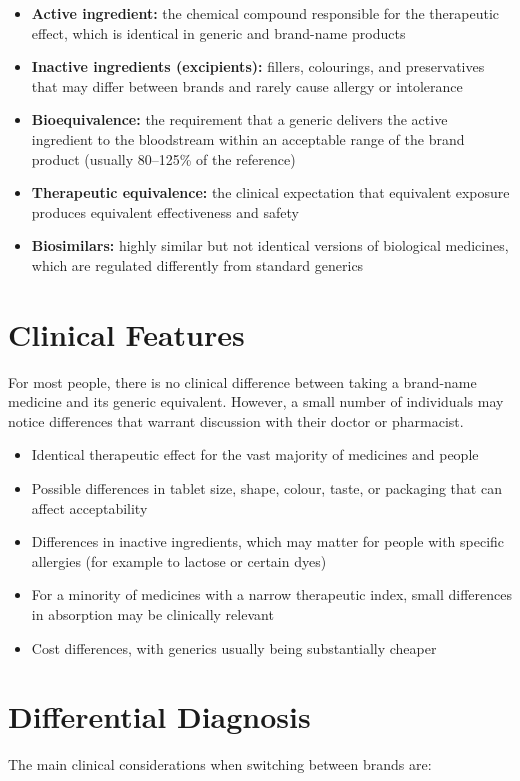\begin{itemize}
    \item \textbf{Active ingredient:} the chemical compound responsible for the therapeutic effect, which is identical in generic and brand-name products
    \item \textbf{Inactive ingredients (excipients):} fillers, colourings, and preservatives that may differ between brands and rarely cause allergy or intolerance
    \item \textbf{Bioequivalence:} the requirement that a generic delivers the active ingredient to the bloodstream within an acceptable range of the brand product (usually 80--125\% of the reference)
    \item \textbf{Therapeutic equivalence:} the clinical expectation that equivalent exposure produces equivalent effectiveness and safety
    \item \textbf{Biosimilars:} highly similar but not identical versions of biological medicines, which are regulated differently from standard generics
\end{itemize}

\section*{Clinical Features}
For most people, there is no clinical difference between taking a brand-name medicine and its generic equivalent. However, a small number of individuals may notice differences that warrant discussion with their doctor or pharmacist.

\begin{itemize}
    \item Identical therapeutic effect for the vast majority of medicines and people
    \item Possible differences in tablet size, shape, colour, taste, or packaging that can affect acceptability
    \item Differences in inactive ingredients, which may matter for people with specific allergies (for example to lactose or certain dyes)
    \item For a minority of medicines with a narrow therapeutic index, small differences in absorption may be clinically relevant
    \item Cost differences, with generics usually being substantially cheaper
\end{itemize}

\section*{Differential Diagnosis}
The main clinical considerations when switching between brands are:

